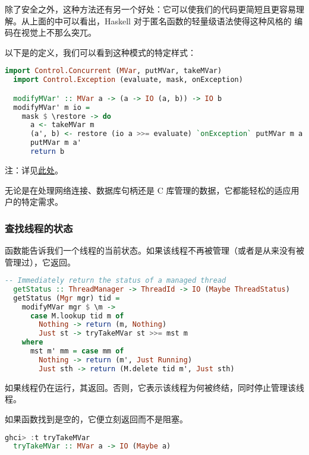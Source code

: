 \documentclass[./main.tex]{subfiles}
\begin{document}
除了安全之外，这种方法还有另一个好处：它可以使我们的代码更简短且更容易理解。从上面的中可以看出，Haskell 对于匿名函数的轻量级语法使得这种风格的
编码在视觉上不那么突兀。

以下是的定义，我们可以看到这种模式的特定样式：

\begin{lstlisting}[language=Haskell]
  import Control.Concurrent (MVar, putMVar, takeMVar)
  import Control.Exception (evaluate, mask, onException)

  modifyMVar' :: MVar a -> (a -> IO (a, b)) -> IO b
  modifyMVar' m io =
    mask $ \restore -> do
      a <- takeMVar m
      (a', b) <- restore (io a >>= evaluate) `onException` putMVar m a
      putMVar m a'
      return b
\end{lstlisting}

注：详见\href{https://hackage.haskell.org/package/ghc-internal-9.1001.0/docs/src/GHC.Internal.Control.Concurrent.MVar.html#modifyMVar}{此处}。

无论是在处理网络连接、数据库句柄还是 C 库管理的数据，它都能轻松的适应用户的特定需求。

\subsubsection*{查找线程的状态}

函数能告诉我们一个线程的当前状态。如果该线程不再被管理（或者是从来没有被管理过），它返回。

\begin{lstlisting}[language=Haskell]
  -- Immediately return the status of a managed thread
  getStatus :: ThreadManager -> ThreadId -> IO (Maybe ThreadStatus)
  getStatus (Mgr mgr) tid =
    modifyMVar mgr $ \m ->
      case M.lookup tid m of
        Nothing -> return (m, Nothing)
        Just st -> tryTakeMVar st >>= mst m
    where
      mst m' mm = case mm of
        Nothing -> return (m', Just Running)
        Just sth -> return (M.delete tid m', Just sth)
\end{lstlisting}

如果线程仍在运行，其返回。否则，它表示该线程为何被终结，同时停止管理该线程。

如果函数找到是空的，它便立刻返回而不是阻塞。

\begin{lstlisting}[language=Haskell]
  ghci> :t tryTakeMVar
  tryTakeMVar :: MVar a -> IO (Maybe a)
\end{lstlisting}
\end{document}
